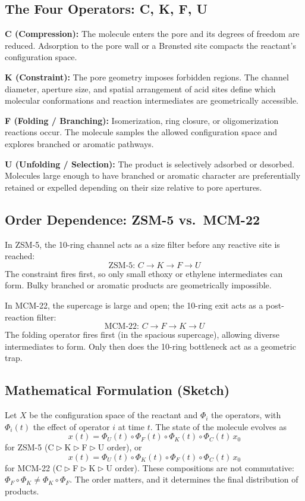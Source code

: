 \documentclass[11pt]{article}
\newcommand{\comp}{\mathrel{\triangleright}} %
\begin{document}
\subsection{The Four Operators: C, K, F, U}

\textbf{C (Compression):} The molecule enters the pore and its degrees of freedom are reduced. Adsorption to the pore wall or a Br\o nsted site compacts the reactant's configuration space.

\textbf{K (Constraint):} The pore geometry imposes forbidden regions. The channel diameter, aperture size, and spatial arrangement of acid sites define which molecular conformations and reaction intermediates are geometrically accessible.

\textbf{F (Folding / Branching):} Isomerization, ring closure, or oligomerization reactions occur. The molecule samples the allowed configuration space and explores branched or aromatic pathways.

\textbf{U (Unfolding / Selection):} The product is selectively adsorbed or desorbed. Molecules large enough to have branched or aromatic character are preferentially retained or expelled depending on their size relative to pore apertures.

\subsection{Order Dependence: ZSM-5 vs.\ MCM-22}

In ZSM-5, the 10-ring channel acts as a size filter before any reactive site is reached:
$$\text{ZSM-5: } C \to K \to F \to U$$
The constraint fires first, so only small ethoxy or ethylene intermediates can form. Bulky branched or aromatic products are geometrically impossible.

In MCM-22, the supercage is large and open; the 10-ring exit acts as a post-reaction filter:
$$\text{MCM-22: } C \to F \to K \to U$$
The folding operator fires first (in the spacious supercage), allowing diverse intermediates to form. Only then does the 10-ring bottleneck act as a geometric trap.

\subsection{Mathematical Formulation (Sketch)}

Let $X$ be the configuration space of the reactant and $\Phi_i$ the operators, with $\Phi_i(t)$ the effect of operator $i$ at time $t$. The state of the molecule evolves as
$$x(t) = \Phi_U(t) \circ \Phi_F(t) \circ \Phi_K(t) \circ \Phi_C(t)\, x_0$$
for ZSM-5 (C$\comp$K$\comp$F$\comp$U order), or
$$x(t) = \Phi_U(t) \circ \Phi_K(t) \circ \Phi_F(t) \circ \Phi_C(t)\, x_0$$
for MCM-22 (C$\comp$F$\comp$K$\comp$U order). These compositions are not commutative: $\Phi_F \circ \Phi_K \neq \Phi_K \circ \Phi_F$. The order matters, and it determines the final distribution of products.
\end{document}
